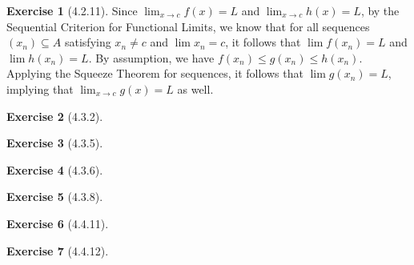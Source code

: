 \documentclass{amsart}
\theoremstyle{definition}
\newtheorem{exercise}{Exercise}
\begin{document}
\begin{exercise}[4.2.11]
  Since $\lim_{x \to c} f(x) = L$ and $\lim_{x \to c} h(x) = L$, by the
  Sequential Criterion for Functional Limits, we know that for all sequences
  $(x_n) \subseteq A$ satisfying $x_n \neq c$ and $\lim x_n = c$, it follows
  that $\lim f(x_n) = L$ and $\lim h(x_n) = L$. By assumption, we have $f(x_n)
  \le g(x_n) \le h(x_n)$. Applying the Squeeze Theorem for sequences, it follows
  that $\lim g(x_n) = L$, implying that $\lim_{x \to c} g(x) = L$ as well.
\end{exercise}

\begin{exercise}[4.3.2]
\end{exercise}

\begin{exercise}[4.3.5]
\end{exercise}

\begin{exercise}[4.3.6]
\end{exercise}

\begin{exercise}[4.3.8]
\end{exercise}

\begin{exercise}[4.4.11]
\end{exercise}

\begin{exercise}[4.4.12]
\end{exercise}
\end{document}
